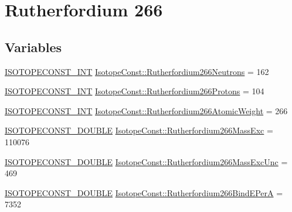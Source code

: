 \hypertarget{group___isotope_const-_rutherfordium-_rf266}{}\section{Rutherfordium 266}
\label{group___isotope_const-_rutherfordium-_rf266}
\subsection*{Variables}
\begin{DoxyCompactItemize}
\item 
\mbox{\hyperlink{group___isotope_const-_macros_ga5f18360b3e99483a35c32d789e62621c}{I\+S\+O\+T\+O\+P\+E\+C\+O\+N\+S\+T\+\_\+\+I\+NT}} \mbox{\hyperlink{group___isotope_const-_rutherfordium-_rf266_gafba6dfe14da70e9082453dbeabc16687}{Isotope\+Const\+::\+Rutherfordium266\+Neutrons}} = 162
\item 
\mbox{\hyperlink{group___isotope_const-_macros_ga5f18360b3e99483a35c32d789e62621c}{I\+S\+O\+T\+O\+P\+E\+C\+O\+N\+S\+T\+\_\+\+I\+NT}} \mbox{\hyperlink{group___isotope_const-_rutherfordium-_rf266_ga51d4880de0008e7b1e6aa5df92f00a37}{Isotope\+Const\+::\+Rutherfordium266\+Protons}} = 104
\item 
\mbox{\hyperlink{group___isotope_const-_macros_ga5f18360b3e99483a35c32d789e62621c}{I\+S\+O\+T\+O\+P\+E\+C\+O\+N\+S\+T\+\_\+\+I\+NT}} \mbox{\hyperlink{group___isotope_const-_rutherfordium-_rf266_ga88869dddd667bee67431a885866bb545}{Isotope\+Const\+::\+Rutherfordium266\+Atomic\+Weight}} = 266
\item 
\mbox{\hyperlink{group___isotope_const-_macros_ga8f45a7272ce02c0b4c65c44636ed719a}{I\+S\+O\+T\+O\+P\+E\+C\+O\+N\+S\+T\+\_\+\+D\+O\+U\+B\+LE}} \mbox{\hyperlink{group___isotope_const-_rutherfordium-_rf266_gaf8cd27c47b3d47f3716e7f7670910b9a}{Isotope\+Const\+::\+Rutherfordium266\+Mass\+Exc}} = 110076
\item 
\mbox{\hyperlink{group___isotope_const-_macros_ga8f45a7272ce02c0b4c65c44636ed719a}{I\+S\+O\+T\+O\+P\+E\+C\+O\+N\+S\+T\+\_\+\+D\+O\+U\+B\+LE}} \mbox{\hyperlink{group___isotope_const-_rutherfordium-_rf266_gad2175ad5b621bdd097b1696d8bec72ab}{Isotope\+Const\+::\+Rutherfordium266\+Mass\+Exc\+Unc}} = 469
\item 
\mbox{\hyperlink{group___isotope_const-_macros_ga8f45a7272ce02c0b4c65c44636ed719a}{I\+S\+O\+T\+O\+P\+E\+C\+O\+N\+S\+T\+\_\+\+D\+O\+U\+B\+LE}} \mbox{\hyperlink{group___isotope_const-_rutherfordium-_rf266_gaea4bb6880f911497d4ad07bb4f2acac6}{Isotope\+Const\+::\+Rutherfordium266\+Bind\+E\+PerA}} = 7352

\end{DoxyCompactItemize}
